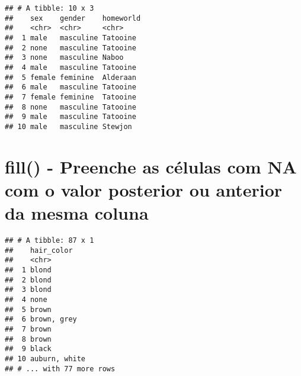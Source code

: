 \documentclass[]{book}
\newenvironment{Shaded}{\begin{snugshade}}{\end{snugshade}}
\newcommand{\DataTypeTok}[1]{\textcolor[rgb]{0.13,0.29,0.53}{#1}}
\newcommand{\DecValTok}[1]{\textcolor[rgb]{0.00,0.00,0.81}{#1}}
\newcommand{\KeywordTok}[1]{\textcolor[rgb]{0.13,0.29,0.53}{\textbf{#1}}}
\newcommand{\NormalTok}[1]{#1}
\newcommand{\OperatorTok}[1]{\textcolor[rgb]{0.81,0.36,0.00}{\textbf{#1}}}
\newcommand{\StringTok}[1]{\textcolor[rgb]{0.31,0.60,0.02}{#1}}
\begin{document}
\begin{Shaded}
\end{Shaded}

\begin{verbatim}
## # A tibble: 10 x 3
##    sex    gender    homeworld
##    <chr>  <chr>     <chr>    
##  1 male   masculine Tatooine 
##  2 none   masculine Tatooine 
##  3 none   masculine Naboo    
##  4 male   masculine Tatooine 
##  5 female feminine  Alderaan 
##  6 male   masculine Tatooine 
##  7 female feminine  Tatooine 
##  8 none   masculine Tatooine 
##  9 male   masculine Tatooine 
## 10 male   masculine Stewjon
\end{verbatim}

\hypertarget{fill---preenche-as-cuxe9lulas-com-na-com-o-valor-posterior-ou-anterior-da-mesma-coluna}{%
\section{fill() - Preenche as células com NA com o valor posterior ou anterior da mesma coluna}\label{fill---preenche-as-cuxe9lulas-com-na-com-o-valor-posterior-ou-anterior-da-mesma-coluna}}

\begin{Shaded}
\end{Shaded}

\begin{verbatim}
## # A tibble: 87 x 1
##    hair_color   
##    <chr>        
##  1 blond        
##  2 blond        
##  3 blond        
##  4 none         
##  5 brown        
##  6 brown, grey  
##  7 brown        
##  8 brown        
##  9 black        
## 10 auburn, white
## # ... with 77 more rows
\end{verbatim}
\end{document}
